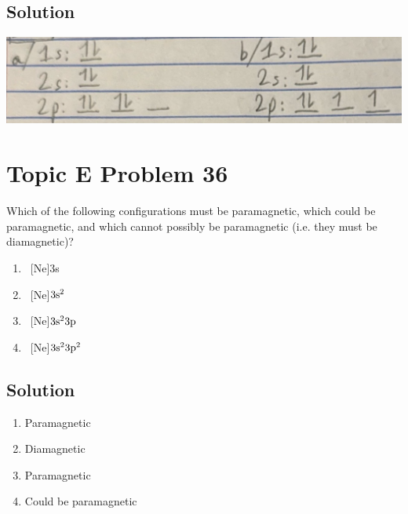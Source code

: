 \documentclass[10pt]{article}
\begin{document}
        \subsection{Solution}
            \begin{center}
                \includegraphics[width=\textwidth]{S-E35.jpg}
            \end{center}

    \pagebreak
    \section{Topic E Problem 36}
        Which of the following configurations must be paramagnetic, which could be paramagnetic, and which cannot possibly be paramagnetic (i.e. they must be diamagnetic)?
        \begin{multicols}{2}
            \begin{enumerate}[label=\alph*)]
                \item   \ [Ne]3s
                \item   \ [Ne]$\rm 3s^2$
                \item   \ [Ne]$\rm 3s^2 3p$
                \item   \ [Ne]$\rm 3s^2 3p^2$
            \end{enumerate}
        \end{multicols}

        \subsection{Solution}
            \begin{multicols}{2}
                \begin{enumerate}[label=\alph*)]
                    \item   Paramagnetic
                    \item   Diamagnetic
                    \item   Paramagnetic
                    \item   Could be paramagnetic
                \end{enumerate}
            \end{multicols}
\end{document}
